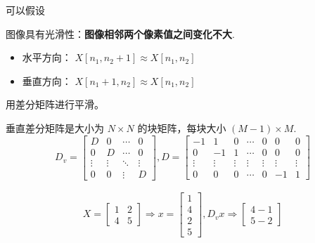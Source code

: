 可以假设

\begin{proposition}[图像逆问题先验假设]
    图像具有光滑性：\textbf{图像相邻两个像素值之间变化不大}.

    \begin{itemize}
    \item 水平方向： $ X\left[n_{1}, n_{2}+1\right] \approx X\left[n_{1}, n_{2}\right] $
    \item 垂直方向： $ X\left[n_{1}+1, n_{2}\right] \approx X\left[n_{1}, n_{2}\right] $
\end{itemize}
\end{proposition}


用差分矩阵进行平滑。

\begin{definition}[垂直差分矩阵]
    
    垂直差分矩阵是大小为 $ N \times N $ 的块矩阵，每块大小 $ (M-1)   \times M $.
    $$D_{v}=\left[\begin{array}{cccc}
        D & 0 & \cdots & 0 \\
        0 & D & \cdots & 0 \\
        \vdots & \vdots & \ddots & \vdots \\
        0 & 0 & \vdots & D
        \end{array}\right], D=\left[\begin{array}{ccccccc}
        -1 & 1 & 0 & \cdots & 0 & 0 & 0 \\
        0 & -1 & 1 & \cdots & 0 & 0 & 0 \\
        \vdots & \vdots & \vdots & \vdots & \vdots & \vdots & \vdots \\
        0 & 0 & 0 & \cdots & 0 & -1 & 1
        \end{array}\right] $$
\end{definition}

\begin{example}
$$
\begin{array}{c}
X=\left[\begin{array}{ll}
1 & 2 \\
4 & 5
\end{array}\right] \Rightarrow x=\left[\begin{array}{l}
1 \\
4 \\
2 \\
5
\end{array}\right], D_{v} x \Rightarrow\left[\begin{array}{l}
4-1 \\
5-2
\end{array}\right]
\end{array}
$$
\end{example}

